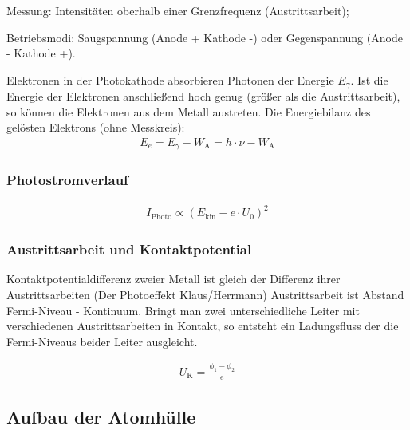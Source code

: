 \documentclass[11pt, a4paper]{article}
\numberwithin{equation}{section}
\begin{document}
Messung: Intensitäten oberhalb einer Grenzfrequenz (Austrittsarbeit);

Betriebsmodi: Saugspannung (Anode + Kathode -) oder Gegenspannung (Anode - Kathode +).


Elektronen in der Photokathode absorbieren Photonen der Energie $E_\gamma$.
Ist die Energie der Elektronen anschließend hoch genug (größer als die Austrittsarbeit), so können die Elektronen aus dem Metall austreten.
Die Energiebilanz des gelösten Elektrons (ohne Messkreis):
\begin{align}
E_e = E_\gamma - W_\mathrm{A} = h \cdot \nu - W_\mathrm{A}
\end{align}

\subsubsection{Photostromverlauf}

\begin{align}
	I_\mathrm{Photo} \propto (E_\mathrm{kin} - e \cdot U_0)^2
\end{align}

\subsubsection{Austrittsarbeit und Kontaktpotential}
Kontaktpotentialdifferenz zweier Metall ist gleich der Differenz ihrer Austrittsarbeiten (Der Photoeffekt Klaus/Herrmann)
Austrittsarbeit ist Abstand Fermi-Niveau - Kontinuum.
Bringt man zwei unterschiedliche Leiter mit verschiedenen Austrittsarbeiten in Kontakt, so entsteht ein Ladungsfluss der die Fermi-Niveaus beider Leiter ausgleicht.

\begin{align}
	U_\mathrm{K} = \frac{\phi_1 - \phi_2}{e}
\end{align}

\subsection{Aufbau der Atomhülle}
\end{document}
